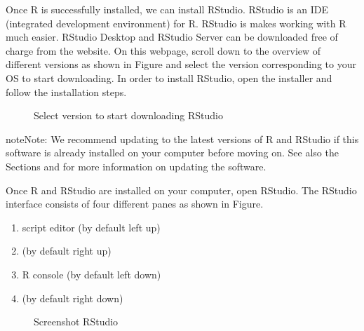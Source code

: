 \documentclass[letterpaper,10pt,english]{sphinxmanual}
\begin{document}
Once R is successfully installed, we can install RStudio. RStudio is an IDE (integrated development environment) for R.
RStudio is makes working with R much easier. RStudio Desktop and RStudio Server can be downloaded
free of charge from the  website.
On this webpage, scroll down to the overview of different versions as shown in Figure  and
select the version corresponding to your OS to start downloading.
In order to install RStudio, open the installer and follow the installation steps.

\begin{figure}[htbp]
\centering
\capstart

\noindent{}
\caption{Select version to start downloading RStudio}\label{\detokenize{installation:fig22}}\label{\detokenize{installation:id8}}\end{figure}

\begin{sphinxadmonition}{note}{Note:}
We recommend updating to the latest versions of R and RStudio if this software is already
installed on your computer before moving on.
See also the Sections {\hyperref[\detokenize{installation:updating-r}]{}} and {\hyperref[\detokenize{installation:updating-rstudio}]{}} for more information on updating the software.
\end{sphinxadmonition}

Once R and RStudio are installed on your computer, open RStudio. The RStudio interface consists
of four different panes as shown in Figure.
\begin{enumerate}
\item {} 
script editor (by default left up)

\item {} 
(by default right up)

\item {} 
R console (by default left down)

\item {} 
(by default right down)

\end{enumerate}

\begin{figure}[htbp]
\centering
\capstart

\noindent{}
\caption{Screenshot RStudio}\label{\detokenize{installation:fig23}}\label{\detokenize{installation:id9}}\end{figure}
\end{document}
